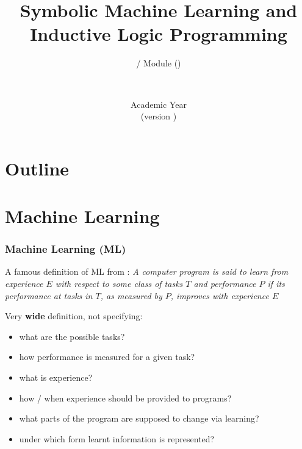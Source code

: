 \documentclass[presentation]{beamer}\mode<presentation>{\usetheme{AMSBolognaFC}}
\title[\currentLab{} -- Symbolic ML \& ILP]{
    Symbolic Machine Learning and Inductive Logic Programming
}
\subtitle{\courseName{} / Module \moduleN{} (\courseAcronym)}
\author[\sspeaker{\gcShort}]{\speaker{\gcFull} \\ \gcEmail}
\institute[\disiShort, \uniboShort]{\disi{} (\disiShort)\\\unibo}
\date[A.Y. \academicYear{} (v.\ \version)]{Academic Year \academicYear{}\\(version \version)}
\begin{document}

\frame{\titlepage}

\section*{Outline}
%
\frame[c]{\tableofcontents[hideallsubsections]}

\section{Machine Learning}

\begin{frame}[allowframebreaks]
\frametitle{Machine Learning (ML)}
    \begin{block}{A famous definition of ML from \cite{Mitchell1997}:}\itshape
        A computer program is said to learn from \alert{experience $E$} with respect to some class of \alert{tasks $T$} and \alert{performance $P$} if its performance at tasks in $T$, as measured by $P$, improves with experience $E$
    \end{block}

    \begin{alertblock}{Very \textbf{wide} definition, not specifying:}
        \begin{itemize}
            \item what are the possible tasks?
            \item how performance is measured for a given task?
            \item what is experience?
            \item how / when experience should be provided to programs?
            \item what parts of the program are supposed to change via learning?
            \item under which form learnt information is represented?
        \end{itemize}
    \end{alertblock}
\end{frame}
\end{document}
